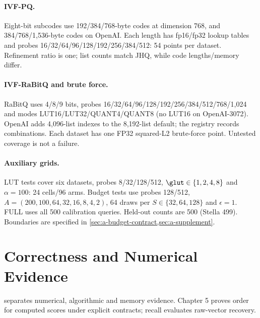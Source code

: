\paragraph{IVF-PQ.}
Eight-bit subcodes use 192/\allowbreak{}384/\allowbreak{}768-byte codes at dimension 768,
and 384/\allowbreak{}768/\allowbreak{}1,536-byte codes on OpenAI. Each length has fp16/fp32
lookup tables and probes 16/\allowbreak{}32/\allowbreak{}64/\allowbreak{}96/\allowbreak{}128/\allowbreak{}192/\allowbreak{}256/\allowbreak{}384/\allowbreak{}512:
54 points per dataset. Refinement ratio is one; list counts match JHQ, while code lengths/memory differ.

\paragraph{IVF-RaBitQ and brute force.}
RaBitQ uses 4/8/9 bits, probes 16/\allowbreak{}32/\allowbreak{}64/\allowbreak{}96/\allowbreak{}128/\allowbreak{}192/\allowbreak{}256/\allowbreak{}384/\allowbreak{}512/\allowbreak{}768/\allowbreak{}1,024 and modes LUT16/LUT32/QUANT4/QUANT8 (no LUT16 on OpenAI-3072). OpenAI adds 4,096-list indexes to the 8,192-list default; the registry records combinations. Each dataset has one FP32 squared-L2 brute-force point. Untested coverage is not a failure.

\paragraph{Auxiliary grids.}
LUT tests cover six datasets, probes 8/32/128/512, $\glut\in\{1,2,4,8\}$ and $\alpha=100$: 24 cells/96 arms. Budget tests use probes 128/\allowbreak{}512, $A=(200,100,64,32,16,8,4,2)$, 64 draws per $S\in\{32,64,128\}$ and $\epsilon=1$. FULL uses all 500 calibration queries. Held-out counts are 500 (Stella 499).  Boundaries are specified in
\cref{sec:a-budget-contract,sec:a-supplement}.

\par\endgroup

\section{Correctness and Numerical Evidence}
\label{sec:b-correctness}
 separates numerical, algorithmic and memory evidence.
Chapter 5 proves order for computed scores under explicit contracts; recall evaluates raw-vector recovery.

